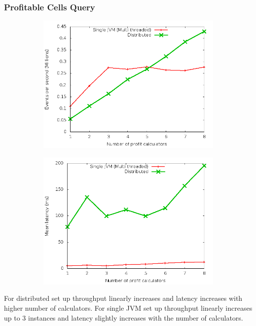 \documentclass[]{beamer}
\begin{document}
\begin{frame}
\frametitle{Profitable Cells Query}

\begin{figure}
        \centering
        \begin{subfigure}[b]{0.45\textwidth}
                \includegraphics[width=\textwidth]{throughput_profit.png}
        \end{subfigure}
        \begin{subfigure}[b]{0.45\textwidth}
                \includegraphics[width=\textwidth]{latency_profit.png}
        \end{subfigure}
\end{figure}

\footnotesize For distributed set up throughput linearly increases and latency increases with higher number of calculators. For single JVM set up throughput linearly increases up to 3 instances and latency slightly increases with the number of calculators. 

\end{frame}
\end{document}
